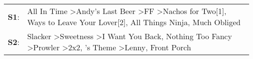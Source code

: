 \begin{supertabular}{p{0.03\textwidth}p{0.92\textwidth}}
 \textbf{S1}:  &                                                                All In Time\textsuperscript{} \textgreater \enspace Andy's Last Beer\textsuperscript{} \textgreater \enspace FF\textsuperscript{} \textgreater \enspace Nachos for Two[1]\textsuperscript{},  Ways to Leave Your Lover[2]\textsuperscript{}, \enspace All Things Ninja\textsuperscript{}, \enspace Much Obliged\textsuperscript{}  \enspace  \\
 \textbf{S2}:  &  Slacker\textsuperscript{} \textgreater \enspace Sweetness\textsuperscript{} \textgreater \enspace I Want You Back\textsuperscript{}, \enspace Nothing Too Fancy\textsuperscript{} \textgreater \enspace Prowler\textsuperscript{} \textgreater \enspace 2x2\textsuperscript{}, 's Theme\textsuperscript{} \textgreater \enspace Lenny\textsuperscript{}, \enspace Front Porch\textsuperscript{}  \enspace  \\
\end{supertabular}
